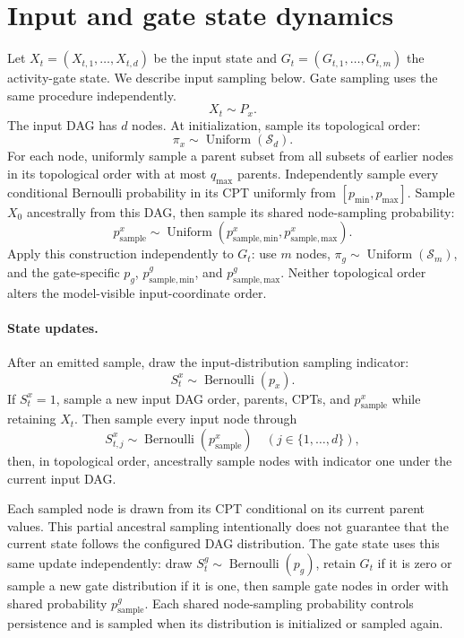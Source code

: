 \documentclass[11pt]{article}
\begin{document}
\section{Input and gate state dynamics}
Let $X_t=(X_{t,1},\ldots,X_{t,d})$ be the input state and
$G_t=(G_{t,1},\ldots,G_{t,m})$ the activity-gate state.  We describe input
sampling below.  Gate sampling uses the same procedure independently.
\[
 X_t\sim P_x.
\]
The input DAG has $d$ nodes.  At initialization, sample its topological order:
\[
 \pi_x\sim\operatorname{Uniform}(\mathcal S_d).
\]
For each node, uniformly sample a parent subset from all subsets of earlier
nodes in its topological order with at most $q_{\max}$ parents.  Independently
sample every conditional Bernoulli probability in its CPT uniformly from
$[p_{\min},p_{\max}]$.  Sample $X_0$ ancestrally from this DAG, then sample
its shared node-sampling probability:
\[
p_{\mathrm{sample}}^x\sim\operatorname{Uniform}
\left(p_{\mathrm{sample,min}}^x,
      p_{\mathrm{sample,max}}^x\right).
\]
Apply this construction independently to $G_t$: use $m$ nodes,
$\pi_g\sim\operatorname{Uniform}(\mathcal S_m)$, and the gate-specific
$p_g$, $p_{\mathrm{sample,min}}^g$, and $p_{\mathrm{sample,max}}^g$.
Neither topological order alters the model-visible input-coordinate order.

\paragraph{State updates.}
After an emitted sample, draw the input-distribution sampling indicator:
\[
 S_t^x\sim\operatorname{Bernoulli}(p_x).
\]
If $S_t^x=1$, sample a new input DAG order, parents, CPTs,
and $p_{\mathrm{sample}}^x$ while retaining $X_t$.  Then sample every input
node through
\[
 S_{t,j}^x\sim\operatorname{Bernoulli}(p_{\mathrm{sample}}^x)
 \quad (j\in\{1,\ldots,d\}),
\]
then, in topological order, ancestrally sample nodes with indicator one under
the current input DAG.

Each sampled node is drawn from its CPT conditional on its current parent
values.  This partial ancestral sampling intentionally does not guarantee that
the current state follows the configured DAG distribution.  The gate state
uses this same update independently: draw $S_t^g\sim\operatorname{Bernoulli}(p_g)$,
retain $G_t$ if it is zero or sample a new gate distribution if it is one,
then sample gate nodes in order with shared probability
$p_{\mathrm{sample}}^g$.  Each shared node-sampling probability controls
persistence and is sampled when its distribution is initialized or sampled
again.
\end{document}
